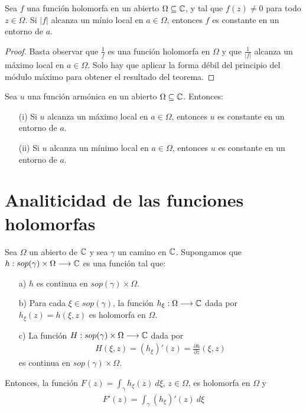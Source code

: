 \begin{teo}
    Sea $f$ una función holomorfa en un abierto $\Omega \subseteq \mathbb{C}$, y tal que $f(z) \not = 0$ para todo $z \in \Omega$. Si $|f|$ alcanza un mínio local en $a \in \Omega$, entonces $f$ es constante en un entorno de $a$.
\end{teo}

\begin{proof}
    Basta observar que $\frac{1}{f}$ es una función holomorfa en $\Omega$ y que $\frac{1}{|f|}$ alcanza un máximo local en $a \in \Omega$. Solo hay que aplicar la forma débil del principio del módulo máximo para obtener el resultado del teorema.
\end{proof}

\begin{teo}
    Sea $u$ una función armónica en un abierto $\Omega \subseteq \mathbb{C}$. Entonces:
    \begin{enumerate}
        \item[(i)] Si $u$ alcanza un máximo local en $a \in \Omega$, entonces $u$ es constante en un entorno de $a$.
        \item[(ii)] Si $u$ alcanza un mínimo local en $a \in \Omega$, entonces $u$ es constante en un entorno de $a$.
    \end{enumerate}
\end{teo}

\newpage

\section{Analiticidad de las funciones holomorfas}

\begin{teo}
    Sea $\Omega$ un abierto de $\mathbb{C}$ y sea $\gamma$ un camino en $\mathbb{C}$. Supongamos que $h: sop(\gamma) \times \Omega \longrightarrow \mathbb{C}$ es una función tal que:
    \begin{enumerate}
        \item[a)] $h$ es continua en $sop(\gamma) \times \Omega$.
        \item[b)] Para cada $\xi \in sop(\gamma)$, la función $h_{\xi}: \Omega \longrightarrow \mathbb{C}$ dada por $h_{\xi}(z) = h(\xi,z)$ es holomorfa en $\Omega$.
        \item[c)] La función $H : sop(\gamma) \times \Omega \longrightarrow \mathbb{C}$ dada por
              \begin{align*}
                  H(\xi,z) = (h_{\xi})'(z) = \frac{\partial h}{\partial z}(\xi,z)
              \end{align*}
              es continua en $sop(\gamma) \times \Omega$.
    \end{enumerate}
    Entonces, la función $F(z) = \int_{\gamma}{h_{\xi}(z) \ d\xi}$, $z \in \Omega$, es holomorfa en $\Omega$ y
    \begin{align*}
        F'(z) = \int_{\gamma}{(h_{\xi})'(z) \ d\xi}
    \end{align*}
\end{teo}

